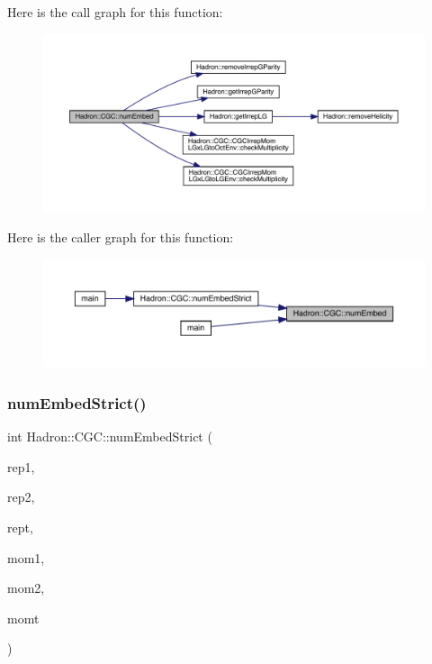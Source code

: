 Here is the call graph for this function\+:\nopagebreak
\begin{figure}[H]
\begin{center}
\leavevmode
\includegraphics[width=350pt]{d9/d19/namespaceHadron_1_1CGC_af727ac6be27b471bc40b4696c2a29cdb_cgraph}
\end{center}
\end{figure}
Here is the caller graph for this function\+:\nopagebreak
\begin{figure}[H]
\begin{center}
\leavevmode
\includegraphics[width=350pt]{d9/d19/namespaceHadron_1_1CGC_af727ac6be27b471bc40b4696c2a29cdb_icgraph}
\end{center}
\end{figure}
\mbox{\label{namespaceHadron_1_1CGC_af5aac6c0d70eb7159aa635525bac7629}} 
\subsubsection{\texorpdfstring{numEmbedStrict()}{numEmbedStrict()}}
{\footnotesize\ttfamily int Hadron\+::\+C\+G\+C\+::num\+Embed\+Strict (\begin{DoxyParamCaption}\item[{const std\+::string \&}]{rep1,  }\item[{const std\+::string \&}]{rep2,  }\item[{const std\+::string \&}]{rept,  }\item[{const Array\+Int \&}]{mom1,  }\item[{const Array\+Int \&}]{mom2,  }\item[{const Array\+Int \&}]{momt }\end{DoxyParamCaption})}


